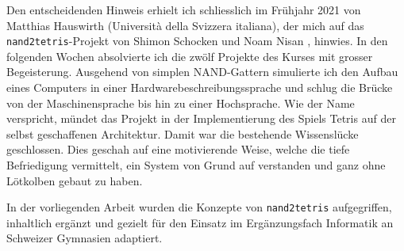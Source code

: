 Den entscheidenden Hinweis erhielt ich schliesslich im Frühjahr 2021 von Matthias Hauswirth (Università della Svizzera italiana), der mich auf das \texttt{nand2tetris}-Projekt von Shimon Schocken und Noam Nisan \cite{nand2tetris-url}, \cite{nand2tetris} hinwies. In den folgenden Wochen absolvierte ich die zwölf Projekte des Kurses mit grosser Begeisterung. Ausgehend von simplen NAND-Gattern simulierte ich den Aufbau eines Computers in einer Hardwarebeschreibungssprache und schlug die Brücke von der Maschinensprache bis hin zu einer Hochsprache. Wie der Name verspricht, mündet das Projekt in der Implementierung des Spiels Tetris auf der selbst geschaffenen Architektur. Damit war die bestehende Wissenslücke geschlossen. Dies geschah auf eine motivierende Weise, welche die tiefe Befriedigung vermittelt, ein System von Grund auf verstanden und ganz ohne Lötkolben gebaut zu haben.

In der vorliegenden Arbeit wurden die Konzepte von \texttt{nand2tetris} aufgegriffen, inhaltlich ergänzt und gezielt für den Einsatz im Ergänzungsfach Informatik an Schweizer Gymnasien adaptiert.